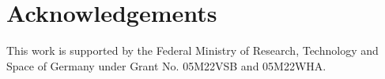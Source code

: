 \documentclass{svproc}
\begin{document}
			\newpage
			\section*{Acknowledgements}{This work is supported by the Federal Ministry of Research, Technology and Space of Germany under Grant No. 05M22VSB and 05M22WHA.}










\end{document}
